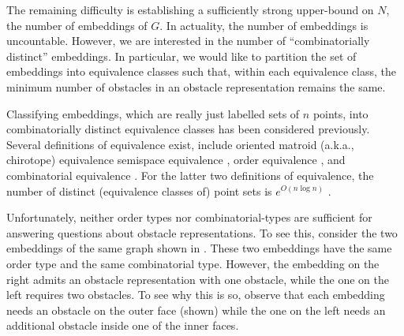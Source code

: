 \documentclass{patmorin}
\begin{document}
The remaining difficulty is establishing a sufficiently strong upper-bound
on $N$, the number of embeddings of $G$. In actuality, the number of
embeddings is uncountable.  However, we are interested in the number of
``combinatorially distinct'' embeddings.  In particular, we would like
to partition the set of embeddings into equivalence classes such that,
within each equivalence class, the minimum number of obstacles in an
obstacle representation remains the same.

Classifying embeddings, which are really just labelled sets of $n$ points,
into combinatorially distinct equivalence classes has been considered
previously. Several definitions of equivalence exist, include oriented
matroid (a.k.a., chirotope) equivalence
\cite{%
  bland.vergnas:orientability,%
  folkman.lawrence:oriented%
} semispace equivalence \cite{goodman.pollack:semispaces}, order equivalence \cite{goodman.pollack:multidimensional}, and combinatorial equivalence
\cite{goodman:on,goodman.pollack:semispaces}.  For the latter two definitions of equivalence, the number
of distinct (equivalence classes of) point sets is $e^{O(n\log n)}$ \cite{goodman.pollack:upper}.


Unfortunately, neither order types nor combinatorial-types are
sufficient for answering questions about obstacle representations.
To see this, consider the two embeddings of the same graph shown in
.  These two embeddings have the same order
type and the same combinatorial type. However, the embedding on the right
admits an obstacle representation with one obstacle, while the one on
the left requires two obstacles. To see why this is so, observe that
each embedding needs an obstacle on the outer face (shown) while the one
on the left needs an additional obstacle inside one of the inner faces.
\end{document}
